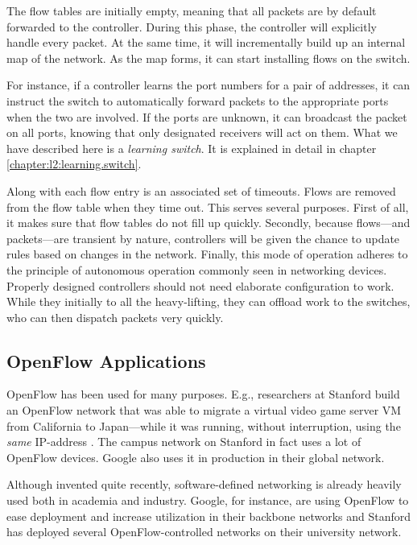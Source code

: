 The flow tables are initially empty, meaning that all packets are by default
forwarded to the controller.  During this phase, the controller will
explicitly handle every packet.  At the same time, it will incrementally
build up an internal map of the network.  As the map forms, it can start
installing flows on the switch.

For instance, if a controller learns the port numbers for a pair of
addresses, it can instruct the switch to automatically forward packets to
the appropriate ports when the two are involved.  If the ports are unknown,
it can broadcast the packet on all ports, knowing that only designated
receivers will act on them.
%
What we have described here is a \textit{learning switch}.  It is explained
in detail in chapter \vref{chapter:l2:learning.switch}.

Along with each flow entry is an associated set of timeouts.  Flows are
removed from the flow table when they time out.
%
This serves several purposes.  First of all, it makes sure that flow tables
do not fill up quickly.  Secondly, because flows---and packets---are
transient by nature, controllers will be given the chance to update rules
based on changes in the network.
%
Finally, this mode of operation adheres to the principle of autonomous
operation commonly seen in networking devices.
%
Properly designed controllers should not need elaborate configuration to
work.  While they initially to all the heavy-lifting, they can offload work
to the switches, who can then dispatch packets very quickly.

\subsection{OpenFlow Applications}

OpenFlow has been used for many purposes.  E.g., researchers at Stanford
build an OpenFlow network that was able to migrate a virtual video game
server \ac{VM} from California to Japan---while it was running, without
interruption, using the \textit{same} IP-address
\cite{erickson2008demonstration} \cite{kobayashi2013maturing}.
%
The campus network on Stanford in fact uses a lot of OpenFlow devices.
Google also uses it in production in their global network.

Although invented quite recently, software-defined networking is already
heavily used both in academia and industry.  Google, for instance, are using
OpenFlow to ease deployment and increase utilization in their backbone
networks \cite{crabbe2012sdn} and Stanford has deployed several
OpenFlow-controlled networks on their university network.

